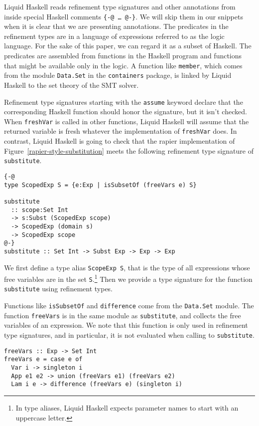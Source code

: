 \documentclass[acmtog, anonymous]{acmart}
\newcommand{\tc}[1]{{\small\texttt{#1}}}
\begin{document}
Liquid Haskell reads refinement type signatures and other annotations from
inside special Haskell comments
\tc{\{-@ \ldots\ @-\}}. We will skip them in our snippets when it is clear
that we are presenting annotations.
The predicates in the refinement types are in a language of expressions
referred to as the logic language. For the sake of this paper, we can
regard it as a subset of Haskell. The predicates are assembled from
functions in the Haskell program and functions that might be available
only in the logic.
A function like \tc{member}, which comes from the module \tc{Data.Set}
in the \tc{containers} package, is linked by Liquid Haskell to the set
theory of the SMT solver.

Refinement type signatures starting with the \tc{assume} keyword declare that the
corresponding Haskell function should honor the signature, but it isn't
checked. When \tc{freshVar} is called in other functions, Liquid Haskell
will assume that the returned variable is fresh whatever the implementation
of \tc{freshVar} does. In contrast, Liquid Haskell is going to check that
the rapier implementation of Figure~\ref{rapier-style-substitution} meets the
following refinement type signature of \tc{substitute}.

\begin{verbatim}
{-@
type ScopedExp S = {e:Exp | isSubsetOf (freeVars e) S}

substitute
  :: scope:Set Int
  -> s:Subst (ScopedExp scope)
  -> ScopedExp (domain s)
  -> ScopedExp scope
@-}
substitute :: Set Int -> Subst Exp -> Exp -> Exp
\end{verbatim}

We first define a type alias \tc{ScopeExp S}, that is the type of all
expressions whose free variables are in the set \tc{S}.\footnote{In type aliases,
Liquid Haskell expects parameter names to start with an uppercase letter.}
Then we provide a type signature for the function \tc{substitute} using
refinement types.

Functions like \tc{isSubsetOf} and \tc{difference} come from the \tc{Data.\allowbreak Set}
module. The function \tc{freeVars} is in the same module as \tc{subs\-ti\-tute},
and collects the free variables of an expression. We note that this function
is only used in refinement type signatures, and in particular, it is not evaluated
when calling to \tc{substitute}.

\begin{verbatim}
freeVars :: Exp -> Set Int
freeVars e = case e of
  Var i -> singleton i
  App e1 e2 -> union (freeVars e1) (freeVars e2)
  Lam i e -> difference (freeVars e) (singleton i)
\end{verbatim}
\end{document}
